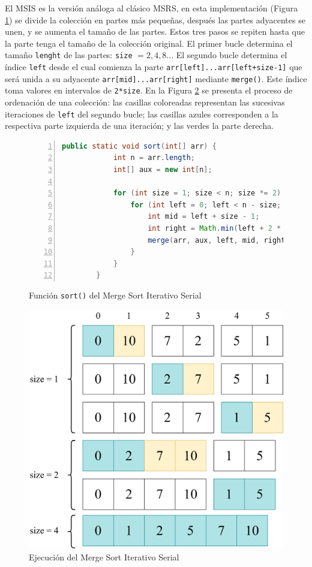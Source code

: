 \documentclass[titlepage]{article}
\begin{document}
El MSIS es la versión análoga al clásico MSRS, en esta implementación (Figura \ref{fig:MSIS_sort()}) se divide la colección en partes más pequeñas, después las partes adyacentes se unen, y se aumenta el tamaño  de las partes. Estos tres pasos se repiten hasta que la parte tenga el tamaño de la colección original. El primer bucle determina el tamaño \lstinline{lenght} de las partes: \lstinline{size} \(=2, 4, 8..\). El segundo bucle determina el índice \lstinline{left} desde el cual comienza la parte \lstinline{arr[left]...arr[left+size-1]} que será unida a su adyacente \lstinline{arr[mid]...arr[right]} mediante \lstinline{merge()}. Este índice toma valores en intervalos de \lstinline{2*size}. En la Figura \ref{fig:ejecuciónMSIS} se presenta el proceso de ordenación de una colección: las casillas coloreadas representan las sucesivas iteraciones de \lstinline{left} del segundo bucle; las casillas azules corresponden a la respectiva parte izquierda de una iteración; y las verdes la parte derecha.

\begin{figure}[hbtp]
    \begin{lstlisting}[language=java, frame=single, numbers=left]
        public static void sort(int[] arr) {
            int n = arr.length;
            int[] aux = new int[n];
    
            for (int size = 1; size < n; size *= 2) {
                for (int left = 0; left < n - size; left += 2 * size) {
                    int mid = left + size - 1;
                    int right = Math.min(left + 2 * size - 1, n - 1);
                    merge(arr, aux, left, mid, right);
                }
            }
        }
    \end{lstlisting}
    \caption{Función \lstinline{sort()} del Merge Sort Iterativo Serial}
    \label{fig:MSIS_sort()}
\end{figure}

\begin{figure}
    \centering
    \includegraphics[width=0.5\linewidth]{Diagrames/ejecucionMSIS.png}
    \caption{Ejecución del Merge Sort Iterativo Serial}
    \label{fig:ejecuciónMSIS}
\end{figure}
\end{document}

